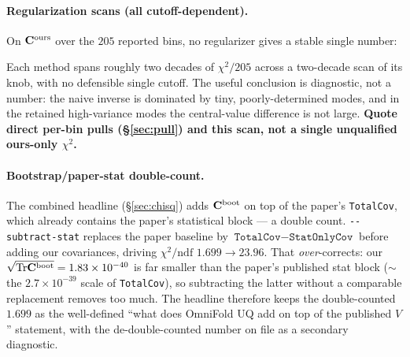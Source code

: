 \paragraph{Regularization scans (all cutoff-dependent).}
On $\mathbf{C}^{\text{ours}}$ over the $205$ reported bins, no regularizer
gives a stable single number:
\begin{center}
\end{center}
Each method spans roughly two decades of $\chi^{2}/205$ across a
two-decade scan of its knob, with no defensible single cutoff. The
useful conclusion is diagnostic, not a number: the naive inverse is
dominated by tiny, poorly-determined modes, and in the retained
high-variance modes the central-value difference is not large.
\textbf{Quote direct per-bin pulls (\S\ref{sec:pull}) and this scan,
not a single unqualified ours-only $\chi^{2}$.}

\paragraph{Bootstrap/paper-stat double-count.}
The combined headline (\S\ref{sec:chisq}) adds $\mathbf{C}^{\text{boot}}$ on
top of the paper's \texttt{TotalCov}, which already contains the
paper's statistical block --- a double count.
\texttt{-{}-subtract-stat} replaces the paper baseline by
$\texttt{TotalCov}-\texttt{StatOnlyCov}$ before adding our covariances,
driving $\chi^{2}/\mathrm{ndf}$ $1.699\to 23.96$. That \emph{over}-corrects:
our $\sqrt{\mathrm{Tr}\mathbf{C}^{\text{boot}}}=1.83\times10^{-40}$ is far smaller
than the paper's published stat block ($\sim$ the $2.7\times10^{-39}$
scale of \texttt{TotalCov}), so subtracting the latter without a
comparable replacement removes too much. The headline therefore keeps
the double-counted $1.699$ as the well-defined ``what does OmniFold UQ
add on top of the published $V$'' statement, with the de-double-counted
number on file as a secondary diagnostic.

